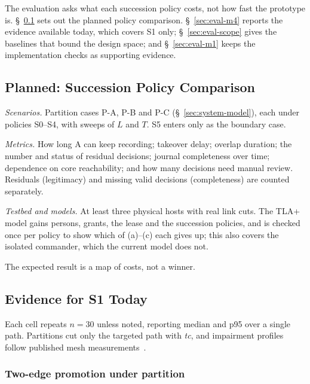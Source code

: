 
The evaluation asks what each succession policy costs, not how fast the prototype is.
\S~\ref{sec:eval-policies} sets out the planned policy comparison.
\S~\ref{sec:eval-m4} reports the evidence available today, which covers S1 only;
\S~\ref{sec:eval-scope} gives the baselines that bound the design space; and
\S~\ref{sec:eval-m1} keeps the implementation checks as supporting evidence.

\subsection{Planned: Succession Policy Comparison}
\label{sec:eval-policies}


\textit{Scenarios.} Partition cases P-A, P-B and P-C (\S~\ref{sec:system-model}), each
under policies S0--S4, with sweeps of $L$ and $T$. S5 enters only as the boundary case.

\textit{Metrics.} How long A can keep recording; takeover delay; overlap duration; the
number and status of residual decisions; journal completeness over time; dependence on
core reachability; and how many decisions need manual review. Residuals (legitimacy) and
missing valid decisions (completeness) are counted separately.

\textit{Testbed and models.} At least three physical hosts with real link cuts. The TLA+
model gains persons, grants, the lease and the succession policies, and is checked once
per policy to show which of (a)--(c) each gives up; this also covers the isolated
commander, which the current model does not.

The expected result is a map of costs, not a winner.

\subsection{Evidence for S1 Today}
\label{sec:eval-promotion}
\label{sec:eval-m4}

Each cell repeats $n=30$ unless noted, reporting median and p95 over a single path.
Partitions cut only the targeted path with \textit{tc}, and impairment profiles follow
published mesh measurements~\cite{zimbelman2022mesh,kumbhar2015legacy}.

\subsubsection{Two-edge promotion under partition}
\label{sec:eval-two-edge}

